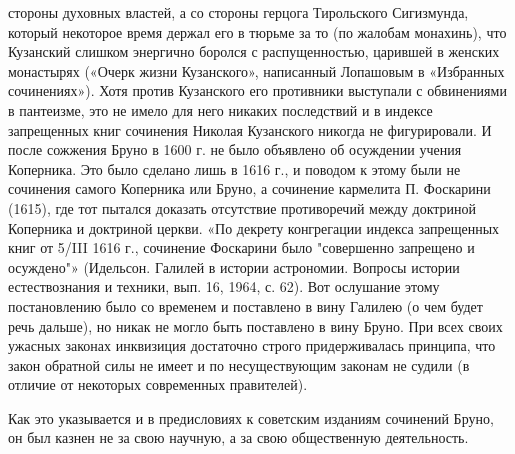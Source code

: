 стороны духовных властей, а со стороны герцога Тирольского Сигизмунда,
который  некоторое  время  держал  его  в тюрьме  за  то  (по  жалобам
монахинь), что  Кузанский слишком энергично боролся  с распущенностью,
царившей в  женских монастырях  («Очерк жизни  Кузанского», написанный
Лопашовым  в  «Избранных  сочинениях»).  Хотя  против  Кузанского  его
противники выступали с обвинениями в  пантеизме, это не имело для него
никаких  последствий и  в индексе  запрещенных книг  сочинения Николая
Кузанского никогда не  фигурировали. И после сожжения Бруно  в 1600 г.
не было объявлено об осуждении учения Коперника. Это было сделано лишь
в  1616 г.,  и  поводом к  этому были  не  сочинения самого  Коперника
или  Бруно,  а  сочинение  кармелита  П.  Фоскарини  (1615),  где  тот
пытался доказать  отсутствие противоречий между доктриной  Коперника и
доктриной церкви. «По декрету  конгрегации индекса запрещенных книг от
5/III  1616  г.,  сочинение  Фоскарини было  "совершенно  запрещено  и
осуждено"» (Идельсон.  Галилей в  истории астрономии.  Вопросы истории
естествознания и техники,  вып. 16, 1964, с. 62).  Вот ослушание этому
постановлению  было со  временем и  поставлено в  вину Галилею  (о чем
будет  речь  дальше),  но  никак  не  могло  быть  поставлено  в  вину
Бруно.  При всех  своих ужасных  законах инквизиция  достаточно строго
придерживалась  принципа,  что  закон  обратной силы  не  имеет  и  по
несуществующим законам  не судили (в отличие  от некоторых современных
правителей).

Как это  указывается и в  предисловиях к советским  изданиям сочинений
Бруно,  он был  казнен  не за  свою научную,  а  за свою  общественную
деятельность.

